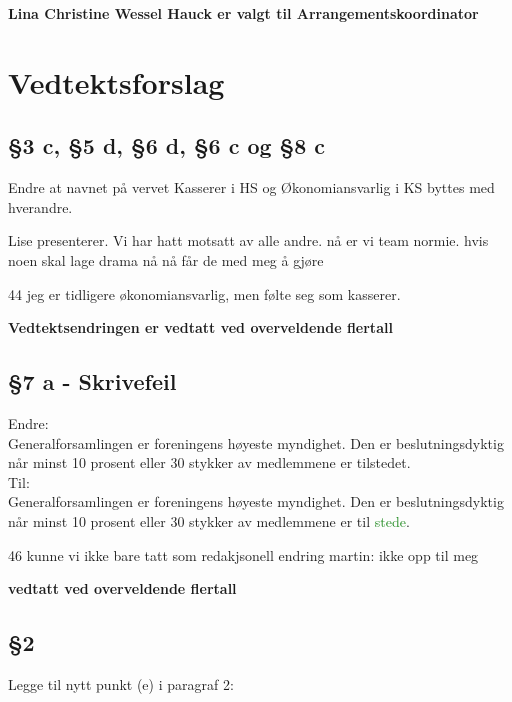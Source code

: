 \documentclass[10pt,norsk,a4paper,usenames,dvipsnames]{article}
\begin{document}
        \textbf{Lina Christine Wessel Hauck er valgt til Arrangementskoordinator}

\newpage

\section{Vedtektsforslag}

    \subsection{§3 c, §5 d, §6 d, §6 c og §8 c}
        Endre at navnet på vervet Kasserer i HS og Økonomiansvarlig i KS byttes med hverandre.
        
        Lise presenterer.
        Vi har hatt motsatt av alle andre. nå er vi team normie. hvis noen skal lage drama nå nå får de med meg å gjøre
        
        44 jeg er tidligere økonomiansvarlig, men følte seg som kasserer.
        
        \textbf{Vedtektsendringen er vedtatt ved overveldende flertall}
        
        
    \subsection{§7 a - Skrivefeil}
        Endre:
        \\Generalforsamlingen er foreningens høyeste myndighet. Den er beslutningsdyktig når minst 10 prosent eller 30 stykker av medlemmene er tilstedet.
        \\Til:
        \\Generalforsamlingen er foreningens høyeste myndighet. Den er beslutningsdyktig når minst 10 prosent eller 30 stykker av medlemmene er til \textcolor{ForestGreen}{stede}.
        
        46 kunne vi ikke bare tatt som redakjsonell endring
        martin: ikke opp til meg
        
        \textbf{vedtatt ved overveldende flertall}

    \subsection{§2}
    Legge til nytt punkt (e) i paragraf 2:
    
\end{document}
